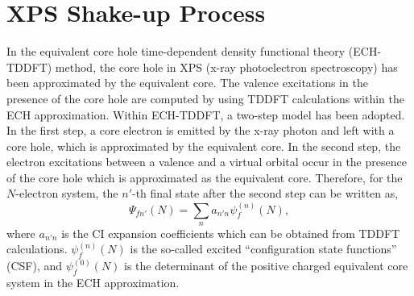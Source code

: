 \documentclass[a4paper,11pt,twoside,openright]{book}
\begin{document}
\section{XPS Shake-up Process}
\label{section-shake-up}

In the equivalent core hole time-dependent density functional theory (ECH-TDDFT)
method\cite{Brena-PRB70-195214,Brena-JCP122-184316}, the core hole in XPS (x-ray photoelectron
spectroscopy) has been approximated by the equivalent core. The valence excitations in the presence
of the core hole are computed by using TDDFT calculations within the ECH approximation. Within
ECH-TDDFT, a two-step model\cite{Brena-JCP122-184316} has been adopted. In the first step, a core
electron is emitted by the x-ray photon and left with a core hole, which is approximated by the equivalent
core. In the second step, the electron excitations between a valence and a virtual orbital occur in the
presence of the core hole which is approximated as the equivalent core. Therefore, for the $N$-electron
system, the $n'$-th final state after the second step can be written as,
\begin{equation}
  \Psi_{fn'}(N)=\sum_{n}a_{n'n}\psi_{f}^{(n)}(N),
\end{equation}
where $a_{n'n}$ is the CI expansion coefficients which can be obtained from TDDFT calculations.
$\psi_{f}^{(n)}(N)$ is the so-called excited ``configuration state functions'' (CSF)\cite{Martin-JCP64-3685},
and $\psi_{f}^{(0)}(N)$ is the determinant of the positive charged equivalent core system in the ECH
approximation.
\end{document}
